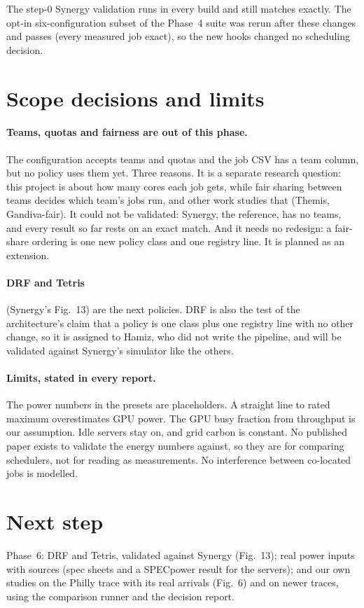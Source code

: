 \documentclass[11pt,a4paper]{article}
\begin{document}
The step-0 Synergy validation runs in every build and still matches exactly. The opt-in six-configuration subset
of the Phase~4 suite was rerun after these changes and passes (every measured job exact), so the new hooks
changed no scheduling decision.

\section{Scope decisions and limits}

\paragraph{Teams, quotas and fairness are out of this phase.} The configuration accepts teams and quotas and the
job CSV has a team column, but no policy uses them yet. Three reasons. It is a separate research question:
this project is about how many cores each job gets, while fair sharing between teams decides which team's jobs run,
and other work studies that (Themis, Gandiva-fair). It could not be validated: Synergy, the reference, has no
teams, and every result so far rests on an exact match. And it needs no redesign: a fair-share ordering is one new
policy class and one registry line. It is planned as an extension.

\paragraph{DRF and Tetris} (Synergy's Fig.~13) are the next policies. DRF is also the test of the
architecture's claim that a policy is one class plus one registry line with no other change, so it is assigned
to Hamiz, who did not write the pipeline, and will be validated against Synergy's simulator like the others.

\paragraph{Limits, stated in every report.} The power numbers in the presets are placeholders. A straight line to
rated maximum overestimates GPU power. The GPU busy fraction from throughput is our assumption. Idle servers stay
on, and grid carbon is constant. No published paper exists to validate the energy numbers against, so they are
for comparing schedulers, not for reading as measurements. No interference between co-located jobs is modelled.

\section{Next step}
Phase~6: DRF and Tetris, validated against Synergy (Fig.~13); real power inputs with sources (spec sheets and a
SPECpower result for the servers); and our own studies on the Philly trace with its real arrivals (Fig.~6) and on
newer traces, using the comparison runner and the decision report.
\end{document}
